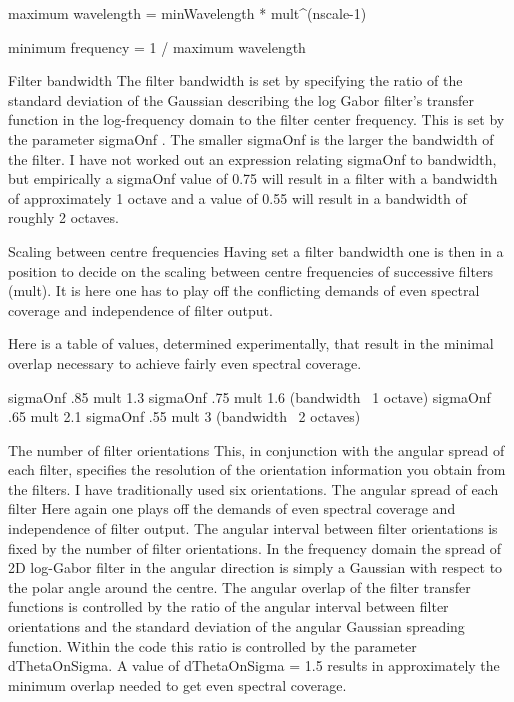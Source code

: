    maximum wavelength = minWavelength * mult^(nscale-1)

   minimum frequency = 1 / maximum wavelength

Filter bandwidth The filter bandwidth is set by specifying the ratio
of the standard deviation of the Gaussian describing the log Gabor
filter's transfer function in the log-frequency domain to the filter
center frequency. This is set by the parameter sigmaOnf . The
smaller sigmaOnf is the larger the bandwidth of the filter. I have
not worked out an expression relating sigmaOnf to bandwidth, but
empirically a sigmaOnf value of 0.75 will result in a filter with a
bandwidth of approximately 1 octave and a value of 0.55 will result
in a bandwidth of roughly 2 octaves.

Scaling between centre frequencies Having set a filter bandwidth one
is then in a position to decide on the scaling between centre
frequencies of successive filters (mult). It is here one has to play
off the conflicting demands of even spectral coverage and
independence of filter output.

Here is a table of values, determined experimentally, that result in
the minimal overlap necessary to achieve fairly even spectral
coverage.

 sigmaOnf  .85   mult 1.3
 sigmaOnf  .75   mult 1.6     (bandwidth ~1 octave)
 sigmaOnf  .65   mult 2.1
 sigmaOnf  .55   mult 3       (bandwidth ~2 octaves)

The number of filter orientations This, in conjunction with the
angular spread of each filter, specifies the resolution of the
orientation information you obtain from the filters. I have
traditionally used six orientations. The angular spread of each
filter Here again one plays off the demands of even spectral
coverage and independence of filter output. The angular interval
between filter orientations is fixed by the number of filter
orientations. In the frequency domain the spread of 2D log-Gabor
filter in the angular direction is simply a Gaussian with respect to
the polar angle around the centre. The angular overlap of the filter
transfer functions is controlled by the ratio of the angular
interval between filter orientations and the standard deviation of
the angular Gaussian spreading function. Within the code this ratio
is controlled by the parameter dThetaOnSigma. A value of
dThetaOnSigma = 1.5 results in approximately the minimum overlap
needed to get even spectral coverage.
